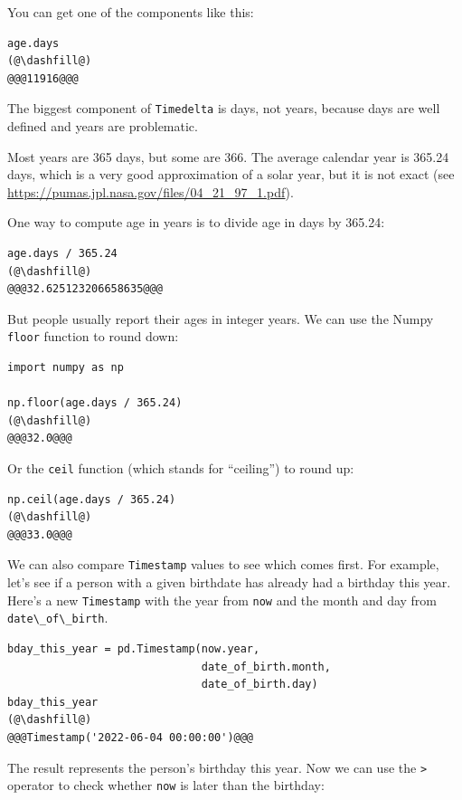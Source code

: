 You can get one of the components like this:

\begin{lstlisting}[]
age.days
(@\dashfill@)
@@@11916@@@
\end{lstlisting}

The biggest component of \passthrough{\lstinline!Timedelta!} is days,
not years, because days are well defined and years are problematic.

Most years are 365 days, but some are 366. The average calendar year is
365.24 days, which is a very good approximation of a solar year, but it
is not exact (see
\url{https://pumas.jpl.nasa.gov/files/04_21_97_1.pdf}).

One way to compute age in years is to divide age in days by 365.24:

\begin{lstlisting}[]
age.days / 365.24
(@\dashfill@)
@@@32.625123206658635@@@
\end{lstlisting}

But people usually report their ages in integer years. We can use the
Numpy \passthrough{\lstinline!floor!} function to round down:

\begin{lstlisting}[]
import numpy as np

np.floor(age.days / 365.24)
(@\dashfill@)
@@@32.0@@@
\end{lstlisting}

Or the \passthrough{\lstinline!ceil!} function (which stands for
``ceiling'') to round up:

\begin{lstlisting}[]
np.ceil(age.days / 365.24)
(@\dashfill@)
@@@33.0@@@
\end{lstlisting}

We can also compare \passthrough{\lstinline!Timestamp!} values to see
which comes first. For example, let's see if a person with a given
birthdate has already had a birthday this year. Here's a new
\passthrough{\lstinline!Timestamp!} with the year from
\passthrough{\lstinline!now!} and the month and day from
\passthrough{\lstinline!date\_of\_birth!}.

\begin{lstlisting}[]
bday_this_year = pd.Timestamp(now.year, 
                              date_of_birth.month, 
                              date_of_birth.day)
bday_this_year
(@\dashfill@)
@@@Timestamp('2022-06-04 00:00:00')@@@
\end{lstlisting}

The result represents the person's birthday this year. Now we can use
the \passthrough{\lstinline!>!} operator to check whether
\passthrough{\lstinline!now!} is later than the birthday:

